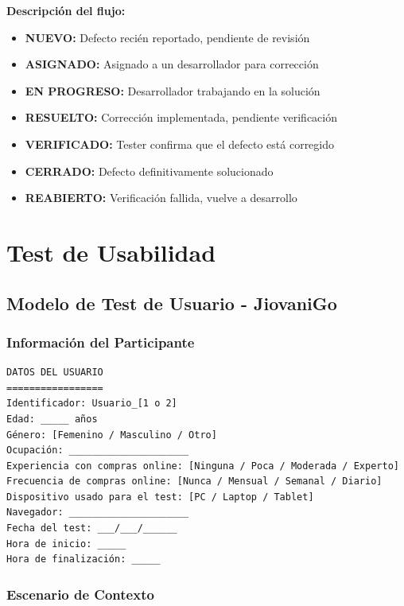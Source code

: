 \documentclass[12pt,a4paper]{article}
\begin{document}
\textbf{Descripción del flujo:}
\begin{itemize}
    \item \textbf{NUEVO:} Defecto recién reportado, pendiente de revisión
    \item \textbf{ASIGNADO:} Asignado a un desarrollador para corrección
    \item \textbf{EN PROGRESO:} Desarrollador trabajando en la solución
    \item \textbf{RESUELTO:} Corrección implementada, pendiente verificación
    \item \textbf{VERIFICADO:} Tester confirma que el defecto está corregido
    \item \textbf{CERRADO:} Defecto definitivamente solucionado
    \item \textbf{REABIERTO:} Verificación fallida, vuelve a desarrollo
\end{itemize}

\section{Test de Usabilidad}

\subsection{Modelo de Test de Usuario - JiovaniGo}

\subsubsection{Información del Participante}

\begin{verbatim}
DATOS DEL USUARIO
=================
Identificador: Usuario_[1 o 2]
Edad: _____ años
Género: [Femenino / Masculino / Otro]
Ocupación: _____________________
Experiencia con compras online: [Ninguna / Poca / Moderada / Experto]
Frecuencia de compras online: [Nunca / Mensual / Semanal / Diario]
Dispositivo usado para el test: [PC / Laptop / Tablet]
Navegador: _____________________
Fecha del test: ___/___/______
Hora de inicio: _____
Hora de finalización: _____
\end{verbatim}

\subsubsection{Escenario de Contexto}
\end{document}
